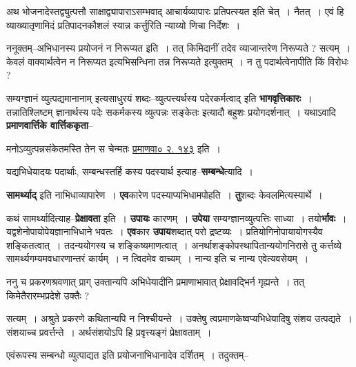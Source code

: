 \documentclass[article,12pt,a4paper]{memoir}
\begin{document}
	  \pstart अथ भोजनादेस्तद्व्युत्पत्तौ साक्षाद्व्यापाराऽसम्भवाद् आचार्यव्यापारः प्रतिपत्स्यत इति चेत् । नैतत् । एवं हि व्याख्यातृणामिदं प्रतिपादनकौशलं स्यान्न कर्त्तुरिति न्याय्यो णिचा निर्देशः ।
	\pend
      

	  \pstart ननूक्तम्--अभिधानस्य प्रयोजनं न निरूप्यत इति । तत् किमिदानीं तदेव व्याजान्तरेण निरूप्यते ? सत्यम् । केवलं वाक्यार्थत्वेन न निरूप्यत इत्यभिसन्धिना तन्न निरूप्यते इत्युक्तम् । न तु पदार्थत्वेनापीति किं विरोधः ?
	\pend
      

	  \pstart सम्यग्ज्ञानं व्युत्पद्यमानानाम् इत्यसाधुरयं शब्दः--व्युत्पत्त्यर्थस्य पदेरकर्मत्वाद् इति \textbf{भागवृत्तिकारः} । तन्नातिश्लिष्टम् ज्ञानार्थस्य पदेः सकर्मकस्य व्युत्पन्नः सङ्केतः इत्यादौ बहुशः प्रयोगदर्शनात् । यथाऽवादि \textbf{प्रमाणवार्त्तिके वार्त्तिककृता}--
	\pend
      

	  \pstart मनोऽव्युत्पन्नसंकेतमस्ति तेन स चेन्मतः \href{http://sarit.indology.info/?cref=pv.2.143}{प्रमाणवा० २. १४३} इति ।
	\pend
      

	  \pstart यद्यभिधेयादयः पदार्थाः, सम्बन्धस्तर्हि कस्य पदस्यार्थ इत्याह--\textbf{सम्बन्धे}त्यादि ।
	\pend
      

	  \pstart \textbf{सामर्थ्याद्} इति नाभिधाव्यापारेण । \textbf{एव}कारेण पदस्याप्यभिधामपोहति । \textbf{तु}शब्दः केवलमित्यस्यार्थे ।
	\pend
      

	  \pstart कथं सामर्थ्यादित्याह--\textbf{प्रेक्षावता} इति । \textbf{उपायः} कारणम् । \textbf{उपेया} सम्यग्ज्ञानव्युत्पत्तिः साध्या । तयो\textbf{र्भावः} । यद्वशेनोपायोपेयज्ञानाभिधाने भवतः । \textbf{एव}कार \textbf{उपाय}शब्दात् परो द्रष्टव्यः । प्रतियोगिनोपायायोगस्यैव शङ्कितत्वात् । तदन्ययोगस्य च शङ्किष्यमाणत्वात् । अनर्थाशङ्कोपस्थापितान्ययोगनिरासे तु कर्त्तव्ये सामर्थ्यगम्यमवधारणान्तरं कार्यम् । न त्विदमेव वाच्यम् । नान्य इति च नान्य एवेत्यवसेयम् ।
	\pend
	  \bigskip
	  \begingroup
	

	  \pstart ननु च प्रकरणश्रवणात् प्राग् उक्तान्यपि अभिधेयादीनि प्रमाणाभावात् प्रेक्षावद्भिर्न गृह्यन्ते । तत् किमेतैरारम्भप्रदेशे उक्तैः ?
	\pend
        

	  \pstart सत्यम् । अश्रुते प्रकरणे कथितान्यपि न निश्चीयन्ते । उक्तेषु त्वप्रमाणकेष्वप्यभिधेयादिषु संशय उत्पद्यते । संशयाच्च प्रवर्त्तन्ते । अर्थसंशयोऽपि हि प्रवृत्त्यङ्गं प्रेक्षावताम् ।
	\pend
      
	  \endgroup
	

	  \pstart एवंरूपस्य सम्बन्धो व्युत्पाद्यत इति प्रयोजनाभिधानादेव दर्शितम् । तदुक्तम्--
	\pend
      
\end{document}
